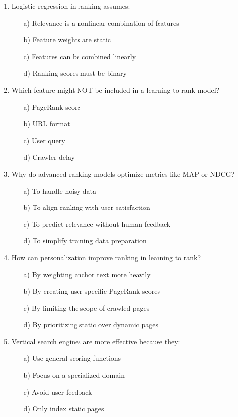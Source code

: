 \documentclass[8pt]{extarticle}
\begin{document}
\begin{multicols}{2}
\begin{enumerate}
\item Logistic regression in ranking assumes:
\begin{itemize}
\item[a)] Relevance is a nonlinear combination of features
\item[b)] Feature weights are static
\item[c)] Features can be combined linearly
\item[d)] Ranking scores must be binary
\end{itemize}

\item Which feature might NOT be included in a learning-to-rank model?
\begin{itemize}
\item[a)] PageRank score
\item[b)] URL format
\item[c)] User query
\item[d)] Crawler delay
\end{itemize}

\item Why do advanced ranking models optimize metrics like MAP or NDCG?
\begin{itemize}
\item[a)] To handle noisy data
\item[b)] To align ranking with user satisfaction
\item[c)] To predict relevance without human feedback
\item[d)] To simplify training data preparation
\end{itemize}

\item How can personalization improve ranking in learning to rank?
\begin{itemize}
\item[a)] By weighting anchor text more heavily
\item[b)] By creating user-specific PageRank scores
\item[c)] By limiting the scope of crawled pages
\item[d)] By prioritizing static over dynamic pages
\end{itemize}

\item Vertical search engines are more effective because they:
\begin{itemize}
\item[a)] Use general scoring functions
\item[b)] Focus on a specialized domain
\item[c)] Avoid user feedback
\item[d)] Only index static pages
\end{itemize}


\end{enumerate}
\end{multicols}
\end{document}

